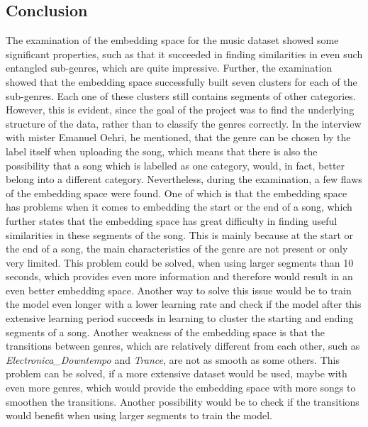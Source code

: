 \subsection{Conclusion}
\label{sub:Results-Music-Conclusion}
The examination of the embedding space for the music dataset showed some significant properties, such as that it succeeded in finding similarities in even such entangled sub-genres, which are quite impressive. Further, the examination showed that the embedding space successfully built seven clusters for each of the sub-genres. Each one of these clusters still contains segments of other categories. However, this is evident, since the goal of the project was to find the underlying structure of the data, rather than to classify the genres correctly. In the interview with mister Emanuel Oehri, he mentioned, that the genre can be chosen by the label itself when uploading the song, which means that there is also the possibility that a song which is labelled as one category, would, in fact, better belong into a different category.
\newline
\newline
Nevertheless, during the examination, a few flaws of the embedding space were found. One of which is that the embedding space has problems when it comes to embedding the start or the end of a song, which further states that the embedding space has great difficulty in finding useful similarities in these segments of the song. This is mainly because at the start or the end of a song, the main characteristics of the genre are not present or only very limited. This problem could be solved, when using larger segments than 10 seconds, which provides even more information and therefore would result in an even better embedding space. Another way to solve this issue would be to train the model even longer with a lower learning rate and check if the model after this extensive learning period succeeds in learning to cluster the starting and ending segments of a song.
\newline
\newline
Another weakness of the embedding space is that the transitions between genres, which are relatively different from each other, such as \textit{Electronica\_Downtempo} and \textit{Trance}, are not as smooth as some others. This problem can be solved, if a more extensive dataset would be used, maybe with even more genres, which would provide the embedding space with more songs to smoothen the transitions. Another possibility would be to check if the transitions would benefit when using larger segments to train the model.
